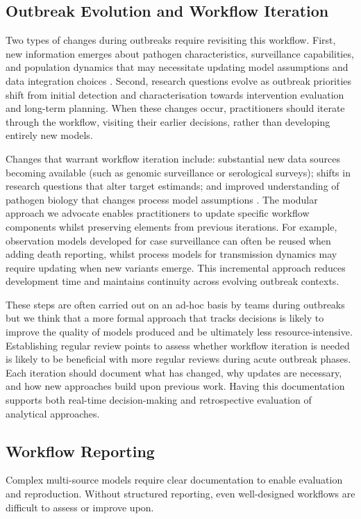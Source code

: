 \documentclass{article}
\begin{document}
\subsection{Outbreak Evolution and Workflow Iteration}
Two types of changes during outbreaks require revisiting this workflow.
First, new information emerges about pathogen characteristics, surveillance capabilities, and population dynamics that may necessitate updating model assumptions and data integration choices \citep{mccaw2023role}.
Second, research questions evolve as outbreak priorities shift from initial detection and characterisation towards intervention evaluation and long-term planning.
When these changes occur, practitioners should iterate through the workflow, visiting their earlier decisions, rather than developing entirely new models.

Changes that warrant workflow iteration include: substantial new data sources becoming available (such as genomic surveillance or serological surveys); shifts in research questions that alter target estimands; and improved understanding of pathogen biology that changes process model assumptions \citep{knock2021key}.
The modular approach we advocate enables practitioners to update specific workflow components whilst preserving elements from previous iterations.
For example, observation models developed for case surveillance can often be reused when adding death reporting, whilst process models for transmission dynamics may require updating when new variants emerge.
This incremental approach reduces development time and maintains continuity across evolving outbreak contexts.

These steps are often carried out on an ad-hoc basis by teams during outbreaks but we think that a more formal approach that tracks decisions is likely to improve the quality of models produced and be ultimately less resource-intensive.
Establishing regular review points to assess whether workflow iteration is needed is likely to be beneficial with more regular reviews during acute outbreak phases.
Each iteration should document what has changed, why updates are necessary, and how new approaches build upon previous work.
Having this documentation supports both real-time decision-making and retrospective evaluation of analytical approaches.

\subsection{Workflow Reporting}
Complex multi-source models require clear documentation to enable evaluation and reproduction.
Without structured reporting, even well-designed workflows are difficult to assess or improve upon.
\end{document}

